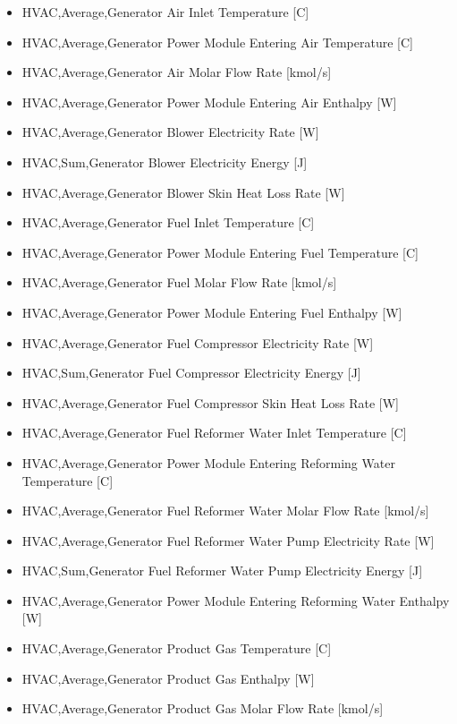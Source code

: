 \begin{itemize}
\item
  HVAC,Average,Generator Air Inlet Temperature {[}C{]}
\item
  HVAC,Average,Generator Power Module Entering Air Temperature {[}C{]}
\item
  HVAC,Average,Generator Air Molar Flow Rate {[}kmol/s{]}
\item
  HVAC,Average,Generator Power Module Entering Air Enthalpy {[}W{]}
\item
  HVAC,Average,Generator Blower Electricity Rate {[}W{]}
\item
  HVAC,Sum,Generator Blower Electricity Energy {[}J{]}
\item
  HVAC,Average,Generator Blower Skin Heat Loss Rate {[}W{]}
\item
  HVAC,Average,Generator Fuel Inlet Temperature {[}C{]}
\item
  HVAC,Average,Generator Power Module Entering Fuel Temperature {[}C{]}
\item
  HVAC,Average,Generator Fuel Molar Flow Rate {[}kmol/s{]}
\item
  HVAC,Average,Generator Power Module Entering Fuel Enthalpy {[}W{]}
\item
  HVAC,Average,Generator Fuel Compressor Electricity Rate {[}W{]}
\item
  HVAC,Sum,Generator Fuel Compressor Electricity Energy {[}J{]}
\item
  HVAC,Average,Generator Fuel Compressor Skin Heat Loss Rate {[}W{]}
\item
  HVAC,Average,Generator Fuel Reformer Water Inlet Temperature {[}C{]}
\item
  HVAC,Average,Generator Power Module Entering Reforming Water Temperature {[}C{]}
\item
  HVAC,Average,Generator Fuel Reformer Water Molar Flow Rate {[}kmol/s{]}
\item
  HVAC,Average,Generator Fuel Reformer Water Pump Electricity Rate {[}W{]}
\item
  HVAC,Sum,Generator Fuel Reformer Water Pump Electricity Energy {[}J{]}
\item
  HVAC,Average,Generator Power Module Entering Reforming Water Enthalpy {[}W{]}
\item
  HVAC,Average,Generator Product Gas Temperature {[}C{]}
\item
  HVAC,Average,Generator Product Gas Enthalpy {[}W{]}
\item
  HVAC,Average,Generator Product Gas Molar Flow Rate {[}kmol/s{]}

\end{itemize}
